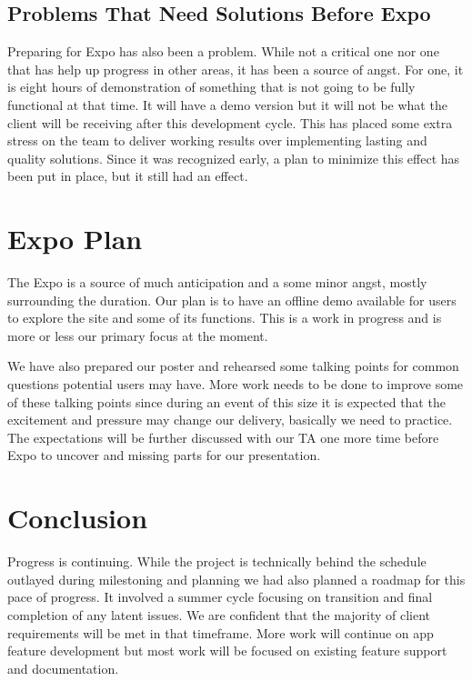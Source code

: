 \documentclass[onecolumn, draftclsnofoot,10pt, compsoc]{IEEEtran}
\begin{document}
\subsection{Problems That Need Solutions Before Expo}
Preparing for Expo has also been a problem. While not a critical one nor one that has help up progress in other areas, it has been a source of angst. For one, it is eight hours of demonstration of something that is not going to be fully functional at that time. It will have a demo version but it will not be what the client will be receiving after this development cycle. This has placed some extra stress on the team to deliver working results over implementing lasting and quality solutions. Since it was recognized early, a plan to minimize this effect has been put in place, but it still had an effect. 

\section{Expo Plan}
The Expo is a source of much anticipation and a some minor angst, mostly surrounding the duration. Our plan is to have an offline demo available for users to explore the site and some of its functions. This is a work in progress and is more or less our primary focus at the moment.

We have also prepared our poster and rehearsed some talking points for common questions potential users may have. More work needs to be done to improve some of these talking points since during an event of this size it is expected that the excitement and pressure may change our delivery, basically we need to practice. The expectations will be further discussed with our TA one more time before Expo to uncover and missing parts for our presentation. 

 \section{Conclusion}
 Progress is continuing. While the project is technically behind the schedule outlayed during milestoning and planning we had also planned a roadmap for this pace of progress. It involved a summer cycle focusing on transition and final completion of any latent issues. We are confident that the majority of client requirements will be met in that timeframe. More work will continue on app feature development but most work will be focused on existing feature support and documentation.
 
 
\end{document}
